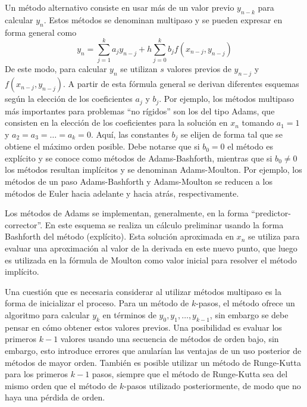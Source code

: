 Un método alternativo consiste en usar más de un valor previo $y_{n-k}$ para calcular $y_{n}$. Estos métodos se denominan multipaso y se pueden expresar en forma general como
\begin{equation}
 y_{n} = \sum_{j=1}^{k}{a_j y_{n-j}} + h \sum_{j=0}^{k}{b_j f(x_{n-j}, y_{n-j})}
\end{equation} 
 De este modo, para calcular $y_n$ se utilizan $s$ valores previos de $y_{n-j}$ y $f(x_{n-j}, y_{n-j})$. A partir de esta fórmula general se derivan diferentes esquemas según la elección de los coeficientes $a_j$ y $b_j$. Por ejemplo, los métodos multipaso más importantes para problemas ``no rígidos'' son los del tipo Adams, que consisten en la elección de los coeficientes para la solución en $x_n$ tomando $a_1 = 1$ y $a_2 = a_3 = \ldots = a_k = 0$. Aquí, las constantes $b_j$ se elijen de forma tal que se obtiene el máximo orden posible. Debe notarse que si $b_0 = 0$ el método es explícito y se conoce como métodos de Adams-Bashforth, mientras que si $b_0 \neq 0$ los métodos resultan implícitos y se denominan Adams-Moulton. Por ejemplo, los métodos de un paso Adams-Bashforth y Adams-Moulton se reducen a los métodos de Euler hacia adelante y hacia atrás, respectivamente. 
 
 Los métodos de Adams se implementan, generalmente, en la forma ``predictor-corrector''. En este esquema se realiza un cálculo preliminar usando la forma Bashforth del método (explícito). Esta solución aproximada en $x_n$ se utiliza para evaluar una aproximación al valor de la derivada en este nuevo punto, que luego es utilizada en la fórmula de Moulton como valor inicial para resolver el método implícito. 
 
 Una cuestión que es necesaria considerar al utilizar métodos multipaso es la forma de inicializar el proceso. Para un método de $k$-pasos, el método ofrece un algoritmo para calcular $y_k$ en términos de $y_0, y_1, \ldots, y_{k-1}$, sin embargo se debe pensar en cómo obtener estos valores previos. Una posibilidad es evaluar los primeros $k-1$ valores usando una secuencia de métodos de orden bajo, sin embargo, esto introduce errores que anularían las ventajas de un uso posterior de métodos de mayor orden. También es posible utilizar un método de Runge-Kutta para los primeros $k-1$ pasos, siempre que el método de Runge-Kutta sea del mismo orden que el método de $k$-pasos utilizado posteriormente, de modo que no haya una pérdida de orden.
 

